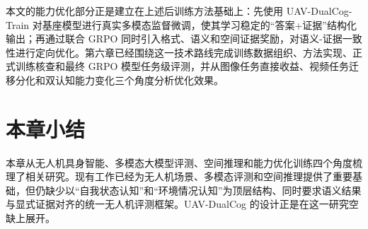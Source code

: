 本文的能力优化部分正是建立在上述后训练方法基础上：先使用 UAV-DualCog-Train 对基座模型进行真实多模态监督微调，使其学习稳定的“答案+证据”结构化输出；再通过联合 GRPO 同时引入格式、语义和空间证据奖励，对语义-证据一致性进行定向优化。第六章已经围绕这一技术路线完成训练数据组织、方法实现、正式训练核查和最终 GRPO 模型任务级评测，并从图像任务直接收益、视频任务迁移分化和双认知能力变化三个角度分析优化效果。

\section{本章小结}

本章从无人机具身智能、多模态大模型评测、空间推理和能力优化训练四个角度梳理了相关研究。现有工作已经为无人机场景、多模态评测和空间推理提供了重要基础，但仍缺少以“自我状态认知”和“环境情况认知”为顶层结构、同时要求语义结果与显式证据对齐的统一无人机评测框架。UAV-DualCog 的设计正是在这一研究空缺上展开。
